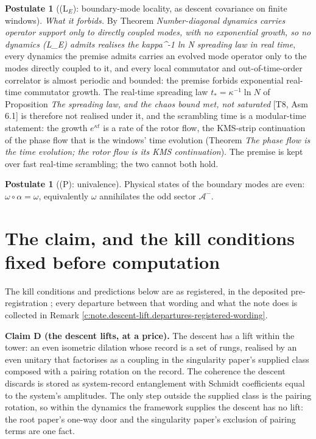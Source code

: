 \documentclass[11pt]{article}
\theoremstyle{definition}
\newtheorem{postulate}[theorem]{Postulate}
\theoremstyle{plain}
\providecommand{\Aod}{}\renewcommand{\Aod}{\mathcal{A}^{-}}
\begin{document}
\begin{postulate}[(L$_E$): boundary-mode locality, as descent covariance on finite windows]
\emph{What it forbids.} By Theorem \emph{Number-diagonal dynamics carries operator support only to directly coupled modes, with no exponential growth, so no dynamics (L\_E) admits realises the kappa\^{}{-1} ln N spreading law in real time}, every dynamics the premise admits carries an evolved mode operator only to the modes directly coupled to it, and every local commutator and out-of-time-order correlator is almost periodic and bounded: the premise forbids exponential real-time commutator growth. The real-time spreading law $t_{*} = \kappa^{-1}\ln N$ of Proposition \emph{The spreading law, and the chaos bound met, not saturated} [T8, Asm 6.1] is therefore not realised under it, and the scrambling time is a modular-time statement: the growth $e^{\kappa t}$ is a rate of the rotor flow, the KMS-strip continuation of the phase flow that is the windows' time evolution (Theorem \emph{The phase flow is the time evolution; the rotor flow is its KMS continuation}). The premise is kept over fast real-time scrambling; the two cannot both hold.
\end{postulate}

\begin{postulate}[(P): univalence]\label{c:singularity.p-univalence}
Physical states of the boundary modes are even: $\omega \circ \alpha = \omega$, equivalently $\omega$ annihilates the odd sector $\Aod$.
\end{postulate}

\section{The claim, and the kill conditions fixed before computation}

\label{c:note.descent-lift.setting-claim-kill-conditions-fixed-before}
The kill conditions and predictions below are as registered, in the deposited pre-registration \cite{ButlerPreregT05dilation}; every departure between that wording and what the note does is collected in Remark \ref{c:note.descent-lift.departures-registered-wording}.

\label{c:note.descent-lift.setting-claim-kill-conditions-fixed-before-2}
\textbf{Claim D (the descent lifts, at a price).} The descent has a lift within the tower: an even isometric dilation whose record is a set of rungs, realised by an even unitary that factorises as a coupling in the singularity paper's supplied class composed with a pairing rotation on the record. The coherence the descent discards is stored as system-record entanglement with Schmidt coefficients equal to the system's amplitudes. The only step outside the supplied class is the pairing rotation, so within the dynamics the framework supplies the descent has no lift: the root paper's one-way door and the singularity paper's exclusion of pairing terms are one fact.
\end{document}
